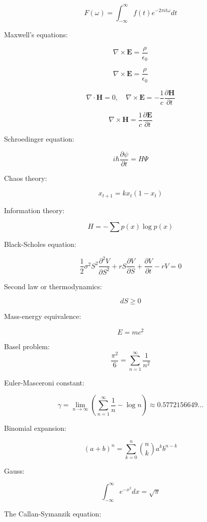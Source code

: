 \documentclass{article}
\begin{document}
\[
  F(\omega) = \int_{-\infty}^\infty f(t) e^{-2\pi i t \omega} dt
\]

Maxwell's equations: 

\begin{equation}
\nabla \times \textbf{E}=\frac{\rho}{\epsilon_0}
\end{equation}

\begin{equation}
\nabla \times \textbf{E}=\frac{\rho}{\epsilon_0}
\end{equation}

\begin{equation}
\nabla \cdot \textbf{H}=0,\quad \nabla \times \textbf{E}=-\frac 1c\frac{\partial \textbf{H}}{\partial t}
\end{equation}

\begin{equation}
\nabla \times \textbf{H}=\frac 1c\frac{\partial \textbf{E}}{\partial t}
\end{equation}

Schroedinger equation:

\[
i \hbar \frac{\partial \psi}{\partial t} = H\Psi
\]

Chaos theory:

$$x_{t+1}=kx_t(1-x_t)$$

Information theory:

\[
  H=-\sum p(x)\log p(x)
\]

Black-Scholes equation:

$$\frac12\sigma^2S^2\frac{\partial^2V}{\partial S^2}+rS\frac{\partial V}{\partial S}+\frac{\partial V}{\partial t}-rV=0$$

Second law or thermodynamics:

$$dS\ge 0$$

Mass-energy equivalence:

$$E=mc^2$$

Basel problem:
\[
  \frac{\pi^2}{6}=\sum_{n=1}^\infty \frac{1}{n^2}
\]

Euler-Masceroni constant:

\[
\gamma = \lim_{n\to\infty}(\sum_{n=1}^\infty \frac{1}{n}-\log n)\approx 0.5772156649\ldots
\]

Binomial expansion:

\[
  (a+b)^n = \sum_{k=0}^n \binom{n}{k} a^k b^{n-k}  
\]

Gauss:

$$\int_{-\infty}^\infty e^{-x^2} dx = \sqrt{\pi}$$

The Callan-Symanzik equation:
\end{document}
